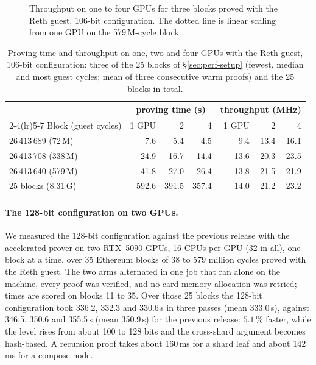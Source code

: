 \begin{figure}[t]
\centering

\caption{Throughput on one to four GPUs for three blocks proved with the Reth guest, 106-bit configuration. The dotted line is linear scaling from one GPU on the 579\,M-cycle block.}
\label{fig:scaling}
\end{figure}

\begin{table}[t]
\centering
\caption{Proving time and throughput on one, two and four GPUs with the Reth guest, 106-bit configuration: three of the 25 blocks of \S\ref{sec:perf-setup} (fewest, median and most guest cycles; mean of three consecutive warm proofs) and the 25 blocks in total.}
\label{tab:cards}
\begin{tabular}{lrrrrrr}
\toprule
 & \multicolumn{3}{c}{proving time (s)} & \multicolumn{3}{c}{throughput (MHz)} \\
\cmidrule(lr){2-4}\cmidrule(lr){5-7}
Block (guest cycles) & 1 GPU & 2 & 4 & 1 GPU & 2 & 4 \\
\midrule
26\,413\,689 (72\,M) & 7.6 & 5.4 & 4.5 & 9.4 & 13.4 & 16.1 \\
26\,413\,708 (338\,M) & 24.9 & 16.7 & 14.4 & 13.6 & 20.3 & 23.5 \\
26\,413\,640 (579\,M) & 41.8 & 27.0 & 26.4 & 13.8 & 21.5 & 21.9 \\
\midrule
25 blocks (8.31\,G) & 592.6 & 391.5 & 357.4 & 14.0 & 21.2 & 23.2 \\
\bottomrule
\end{tabular}
\end{table}

\paragraph{The 128-bit configuration on two GPUs.}\label{sec:perf-pq128} We measured the 128-bit configuration against the previous release with the accelerated prover on two RTX~5090 GPUs, 16 CPUs per GPU (32 in all), one block at a time, over 35 Ethereum blocks of 38 to 579 million cycles proved with the Reth guest. The two arms alternated in one job that ran alone on the machine, every proof was verified, and no card memory allocation was retried; times are scored on blocks 11 to 35. Over those 25 blocks the 128-bit configuration took 336.2, 332.3 and 330.6\,s in three passes (mean 333.0\,s), against 346.5, 350.6 and 355.5\,s (mean 350.9\,s) for the previous release: $5.1\,\%$ faster, while the level rises from about 100 to 128 bits and the cross-shard argument becomes hash-based. A recursion proof takes about 160\,ms for a shard leaf and about 142\,ms for a compose node.

